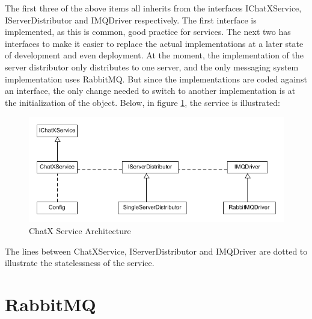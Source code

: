 The first three of the above items all inherits from the interfaces IChatXService, IServerDistributor and IMQDriver respectively. The first interface is implemented, as this is common, good practice for services. The next two has interfaces to make it easier to replace the actual implementations at a later state of development and even deployment. At the moment, the implementation of the server distributor only distributes to one server, and the only messaging system implementation uses RabbitMQ. But since the implementations are coded against an interface, the only change needed to switch to another implementation is at the initialization of the object.
Below, in figure \ref{fig:ServiceArchitecture}, the service is illustrated:

\begin{figure}[h]
	\centering
	\includegraphics[width=0.7\linewidth]{img/ServiceArchitecture}
	\caption[Communication-diagram]{ChatX Service Architecture}
	\label{fig:ServiceArchitecture}
\end{figure}

The lines between ChatXService, IServerDistributor and IMQDriver are dotted to illustrate the statelessness of the service.

\section{RabbitMQ}